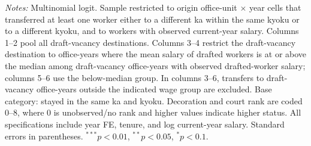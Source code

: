 \begin{table}[htbp]
\begin{threeparttable}
{\begin{tabular}{lcccccc}
\bottomrule
\end{tabular}}
\begin{tablenotes}[flushleft]\footnotesize
\item \textit{Notes:} Multinomial logit. Sample restricted to origin office-unit $\times$ year cells that transferred at least one worker either to a different ka within the same kyoku or to a different kyoku, and to workers with observed current-year salary. Columns 1--2 pool all draft-vacancy destinations. Columns 3--4 restrict the draft-vacancy destination to office-years where the mean salary of drafted workers is at or above the median among draft-vacancy office-years with observed drafted-worker salary; columns 5--6 use the below-median group. In columns 3--6, transfers to draft-vacancy office-years outside the indicated wage group are excluded. Base category: stayed in the same ka and kyoku. Decoration and court rank are coded 0--8, where 0 is unobserved/no rank and higher values indicate higher status. All specifications include year FE, tenure, and log current-year salary. Standard errors in parentheses. $^{***}p<0.01$, $^{**}p<0.05$, $^{*}p<0.1$.
\end{tablenotes}\end{threeparttable}\end{table}
